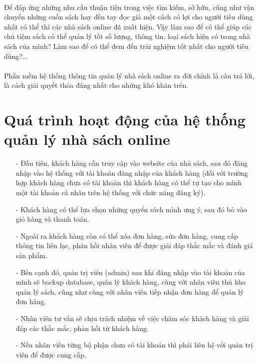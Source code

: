 \documentclass{report}
\begin{document}
\paragraph{}
    Để đáp ứng những nhu cầu thuận tiện trong việc tìm kiếm, sở hữu, cũng như vận chuyển những cuốn sách hay đến tay đọc giả một cách có lợi cho người tiêu dùng nhất có thể thì các nhà sách online đã xuất hiện. Vậy làm sao để có thể giúp các chủ tiệm sách có thể quản lý tốt số lượng, thông tin, loại sách hiện có trong nhà sách của mình? Làm sao để có thể đem đến trải nghiệm tốt nhất cho người tiêu dùng?...
\paragraph{}
    Phần mềm hệ thống thông tin quản lý nhà sách online ra đời chính là câu trả lời, là cách giải quyết thỏa đáng nhất cho những khó khăn trên.
\section{Quá trình hoạt động của hệ thống quản lý nhà sách online}

\begin{enumerate}
    \item[- ] Đầu tiên, khách hàng cần truy cập vào website của nhà sách, sau đó đăng nhập vào hệ thống với tài khoản đăng nhập của khách hàng (đối với trường hợp khách hàng chưa có tài khoản thì khách hàng có thể tự tạo cho mình một tài khoản cá nhân trên hệ thống với chức năng đăng ký).
    \item[- ] Khách hàng có thể lựa chọn những quyển sách mình ưng ý, sau đó bỏ vào giỏ hàng và thanh toán.
    \item[- ] Ngoài ra khách hàng còn có thể xóa đơn hàng, sửa đơn hàng, cung cấp thông tin liên lạc, phản hồi nhân viên để được giải đáp thắc mắc và đánh giá sản phẩm.
    \item[- ] Bên cạnh đó, quản trị viên (admin) sau khi đăng nhập vào tài khoản của mình sẽ backup database, quản lý khách hàng, cùng với nhân viên thủ kho quản lý sách, cũng như cùng với nhân viên tiếp nhận đơn hàng để quản lý đơn hàng.
    \item[- ] Nhân viên tư vấn sẽ chịu trách nhiệm về việc chăm sóc khách hàng và giải đáp các thắc mắc, phản hồi từ khách hàng.
    \item[- ] Nếu nhân viên từng bộ phận chưa có tài khoản thì phải liên hệ với quản trị viên để được cung cấp.
\end{enumerate}
\end{document}
